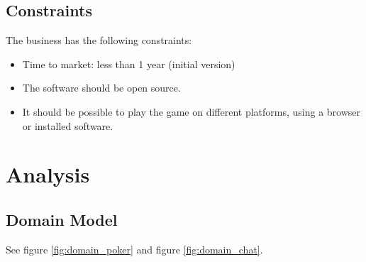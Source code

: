 \documentclass[a4paper,11pt]{report}
\begin{document}
\section{Constraints}
The business has the following constraints:
\begin{itemize}
\item Time to market: less than 1 year (initial version)
\item The software should be open source.
\item It should be possible to play the game on different platforms, using a browser or installed software.
\end{itemize}

\chapter{Analysis}
\section{Domain Model}
See figure \ref{fig:domain_poker} and figure \ref{fig:domain_chat}.
\end{document}

